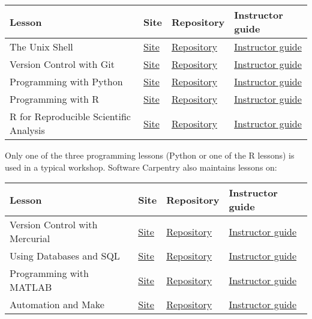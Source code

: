\begin{longtable}{|l|l|l|l|}
\hline
Lesson & Site & Repository & Instructor guide\\
\hline
The Unix Shell & \href{\{\{site.swc\_pages\}\}/shell-novice/}{Site} & \href{https://github.com/swcarpentry/shell-novice}{Repository} & \href{\{\{site.swc\_pages\}\}/shell-novice/guide/}{Instructor guide}\\
Version Control with Git & \href{\{\{site.swc\_pages\}\}/git-novice/}{Site} & \href{https://github.com/swcarpentry/git-novice}{Repository} & \href{\{\{site.swc\_pages\}\}/git-novice/guide/}{Instructor guide}\\
Programming with Python & \href{\{\{site.swc\_pages\}\}/python-novice-inflammation/}{Site} & \href{https://github.com/swcarpentry/python-novice-inflammation}{Repository} & \href{\{\{site.swc\_pages\}\}/python-novice-inflammation/guide/}{Instructor guide}\\
Programming with R & \href{\{\{site.swc\_pages\}\}/r-novice-inflammation/}{Site} & \href{https://github.com/swcarpentry/r-novice-inflammation}{Repository} & \href{\{\{site.swc\_pages\}\}/r-novice-inflammation/guide/}{Instructor guide}\\
R for Reproducible Scientific Analysis & \href{\{\{site.swc\_pages\}\}/r-novice-gapminder/}{Site} & \href{https://github.com/swcarpentry/r-novice-gapminder}{Repository} & \href{\{\{site.swc\_pages\}\}/r-novice-gapminder/guide/}{Instructor guide}\\
\hline
\end{longtable}

Only one of the three programming lessons (Python or one of the R lessons) is used in a typical workshop.
Software Carpentry also maintains lessons on:

\begin{longtable}{|l|l|l|l|}
\hline
Lesson & Site & Repository & Instructor guide\\
\hline
Version Control with Mercurial & \href{\{\{site.swc\_pages\}\}/hg-novice/}{Site} & \href{https://github.com/swcarpentry/hg-novice}{Repository} & \href{\{\{site.swc\_pages\}\}/hg-novice/guide/}{Instructor guide}\\
Using Databases and SQL & \href{\{\{site.swc\_pages\}\}/sql-novice-survey/}{Site} & \href{https://github.com/swcarpentry/sql-novice-survey}{Repository} & \href{\{\{site.swc\_pages\}\}/sql-novice-survey/guide/}{Instructor guide}\\
Programming with MATLAB & \href{\{\{site.swc\_pages\}\}/matlab-novice-inflammation/}{Site} & \href{https://github.com/swcarpentry/matlab-novice-inflammation}{Repository} & \href{\{\{site.swc\_pages\}\}/matlab-novice-inflammation/guide/}{Instructor guide}\\
Automation and Make & \href{\{\{site.swc\_pages\}\}/make-novice/}{Site} & \href{https://github.com/swcarpentry/make-novice}{Repository} & \href{\{\{site.swc\_pages\}\}/make-novice/guide/}{Instructor guide}\\
\hline
\end{longtable}

